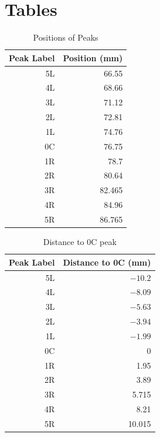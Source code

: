 \section{Tables}
\begin{table}[ht]
	\centering
	\begin{tabular}{|r|r|} \hline
		Peak Label & Position (mm) \\
		\hline
		5L & 66.55 \\
		4L & 68.66 \\
		3L & 71.12 \\
		2L & 72.81 \\
		1L & 74.76 \\
		0C & 76.75 \\
		1R & 78.7 \\
		2R & 80.64 \\
		3R & 82.465 \\
		4R & 84.96 \\
		5R & 86.765 \\
		\hline
	\end{tabular}
	\caption{Positions of Peaks}
	\label{table.pos}
\end{table}
\begin{table}[ht]
	\centering
	\begin{tabular}{|r|r|} \hline
		Peak Label & Distance to 0C (mm) \\
		\hline
		5L & $-10.2$ \\
		4L & $-8.09$ \\
		3L & $-5.63$ \\
		2L & $-3.94$ \\
		1L & $-1.99$ \\
		0C & 0 \\
		1R & 1.95 \\
		2R & 3.89 \\
		3R & 5.715 \\
		4R & 8.21 \\
		5R & 10.015 \\
		\hline
	\end{tabular}
	\caption{Distance to 0C peak}
	\label{table.disC}
\end{table}
